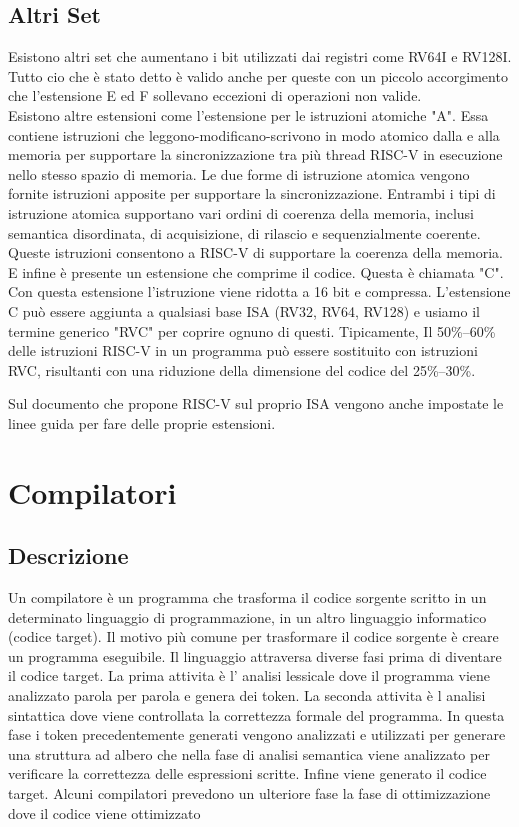 \documentclass[12pt,a4paper]{report}
\begin{document}
\section{ Altri Set}
Esistono altri set che aumentano i bit utilizzati dai registri come RV64I e RV128I. Tutto cio che è stato detto è valido anche per queste con un piccolo accorgimento che l'estensione E ed F sollevano eccezioni di operazioni non valide.\\
Esistono altre estensioni come l'estensione per le istruzioni atomiche "A". Essa  contiene istruzioni che leggono-modificano-scrivono in modo atomico dalla e alla memoria per supportare la sincronizzazione tra
più thread RISC-V in esecuzione nello stesso spazio di memoria. Le due forme di istruzione atomica
vengono fornite istruzioni apposite per supportare la sincronizzazione. Entrambi i tipi di istruzione atomica supportano vari ordini di coerenza della memoria, inclusi
semantica disordinata, di acquisizione, di rilascio e sequenzialmente coerente. Queste istruzioni consentono a RISC-V di supportare la coerenza della memoria.\\
E infine è presente un estensione che comprime il codice. Questa è chiamata "C". Con questa estensione l'istruzione viene ridotta a 16 bit e compressa. L'estensione C può essere aggiunta a qualsiasi base
ISA (RV32, RV64, RV128) e usiamo il termine generico "RVC" per coprire ognuno di questi. Tipicamente,
Il 50\%–60\% delle istruzioni RISC-V in un programma può essere sostituito con istruzioni RVC, risultanti
con una riduzione della dimensione del codice del 25\%–30\%.


Sul documento che propone RISC-V sul proprio ISA vengono anche impostate le linee guida per fare delle proprie estensioni.



\chapter{Compilatori}


\section{Descrizione}
Un compilatore è un programma che trasforma il codice sorgente scritto in un determinato linguaggio di programmazione,  in un altro linguaggio informatico (codice target). Il motivo più comune per trasformare il codice sorgente è creare un programma eseguibile. Il linguaggio attraversa diverse fasi prima di diventare il codice target. La prima attivita è l' analisi lessicale dove il programma viene analizzato parola per parola e genera dei token. La seconda attivita è l analisi sintattica dove viene controllata la correttezza formale del programma. In questa fase i token precedentemente generati vengono analizzati e utilizzati per generare una struttura ad albero che nella fase di analisi semantica viene analizzato per verificare la correttezza delle espressioni scritte.  Infine viene generato il codice target.  Alcuni compilatori prevedono un ulteriore fase la fase di ottimizzazione dove il codice viene ottimizzato 
\end{document}
